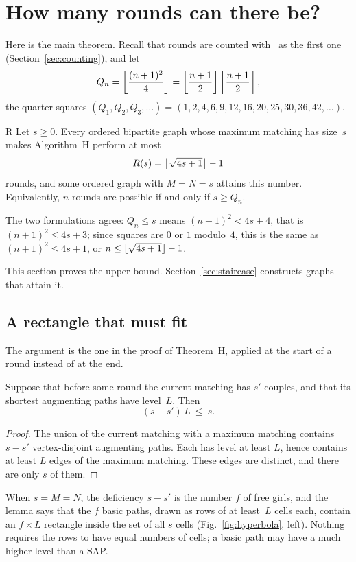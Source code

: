\section{How many rounds can there be?}
\label{sec:upper}

Here is the main theorem. Recall that rounds are counted with~ as
the first one (Section~\ref{sec:counting}), and let
\[
   Q_n=\left\lfloor\frac{(n+1)^2}{4}\right\rfloor=\left\lfloor\frac{n+1}2\right\rfloor\left\lceil\frac{n+1}2\right\rceil,
\]
the quarter-squares $(Q_1,Q_2,Q_3,\ldots)=(1,2,4,6,9,12,16,20,25,30,36,42,\ldots)$.

\begin{lthm}{R}
Let $s\ge0$. Every ordered bipartite graph whose maximum matching has
size~$s$ makes Algorithm~H perform at most
\[
   R(s)=\left\lfloor\sqrt{4s+1}\right\rfloor-1
\]
rounds, and some ordered graph with $M=N=s$ attains this number.
Equivalently, $n$ rounds are possible if and only if $s\ge Q_n$.
\end{lthm}

The two formulations agree: $Q_n\le s$ means $(n+1)^2<4s+4$, that is
$(n+1)^2\le4s+3$; since squares are $0$ or $1$ modulo~$4$, this is the
same as $(n+1)^2\le4s+1$, or $n\le\lfloor\sqrt{4s+1}\rfloor-1$.

This section proves the upper bound. Section~\ref{sec:staircase}
constructs graphs that attain it.

\subsection{A rectangle that must fit}

The argument is the one in the proof of Theorem~H, applied at the start
of a round instead of at the end.

\begin{lemma}
\label{lem:rectangle}
Suppose that before some round the current matching has $s'$ couples,
and that its shortest augmenting paths have level~$L$. Then
\[
   (s-s')\,L\ \le\ s .
\]
\end{lemma}

\begin{proof}
The union of the current matching with a maximum matching contains
$s-s'$ vertex-disjoint augmenting paths. Each has level at least $L$,
hence contains at least $L$ edges of the maximum matching. These edges
are distinct, and there are only $s$ of them.
\end{proof}

When $s=M=N$, the deficiency $s-s'$ is the number $f$ of free girls, and
the lemma says that the $f$ basic paths, drawn as rows of at least~$L$
cells each, contain an $f\times L$ rectangle inside the set of all $s$
cells (Fig.~\ref{fig:hyperbola}, left). Nothing requires the rows to have
equal numbers of cells; a basic path may have a much higher level than a
SAP.

